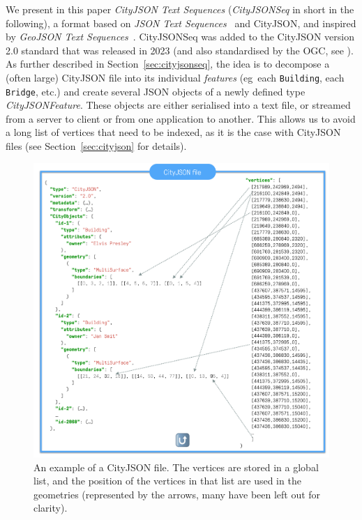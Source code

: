 \documentclass{isprs} %
\newcommand{\eg}{eg}
\begin{document}
We present in this paper \emph{CityJSON Text Sequences} (\emph{CityJSONSeq} in short in the following), a format based on \emph{JSON Text Sequences}~\citep{IETF-JSONSeq} and CityJSON, and inspired by \emph{GeoJSON Text Sequences}~\citep{IETF-GeoJSONSeq}. 
CityJSONSeq was added to the CityJSON version 2.0 standard that was released in 2023 (and also standardised by the OGC, see \citet{OGC-CityJSON-v20}).
As further described in Section~\ref{sec:cityjsonseq}, the idea is to decompose a (often large) CityJSON file into its individual \emph{features} (\eg\ each \texttt{Building}, each \texttt{Bridge}, etc.) and create several JSON objects of a newly defined type \emph{CityJSONFeature}.
These objects are either serialised into a text file, or streamed from a server to client or from one application to another.
This allows us to avoid a long list of vertices that need to be indexed, as it is the case with CityJSON files (see Section~\ref{sec:cityjson} for details).
\begin{figure}
  \centering
  \includegraphics[width=0.95\linewidth]{figs/cj_idea}
  \caption{An example of a CityJSON file. The vertices are stored in a global list, and the position of the vertices in that list are used in the geometries (represented by the arrows, many have been left out for clarity).}%
\label{fig:cj_idea}
\end{figure}

%
\end{document}
